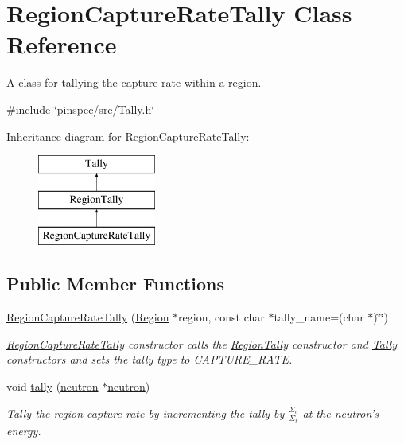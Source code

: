 \hypertarget{classRegionCaptureRateTally}{\section{Region\-Capture\-Rate\-Tally Class Reference}
\label{classRegionCaptureRateTally}
}


A class for tallying the capture rate within a region.  




{\ttfamily \#include \char`\"{}pinspec/src/\-Tally.\-h\char`\"{}}

Inheritance diagram for Region\-Capture\-Rate\-Tally\-:\begin{figure}[H]
\begin{center}
\leavevmode
\includegraphics[height=3.000000cm]{classRegionCaptureRateTally}
\end{center}
\end{figure}
\subsection*{Public Member Functions}
\begin{DoxyCompactItemize}
\item 
\hyperlink{classRegionCaptureRateTally_a7d0e48235eb320f44fa11b4395e3b7ae}{Region\-Capture\-Rate\-Tally} (\hyperlink{classRegion}{Region} $\ast$region, const char $\ast$tally\-\_\-name=(char $\ast$)\char`\"{}\char`\"{})
\begin{DoxyCompactList}\small\item\em \hyperlink{classRegionCaptureRateTally}{Region\-Capture\-Rate\-Tally} constructor calls the \hyperlink{classRegionTally}{Region\-Tally} constructor and \hyperlink{classTally}{Tally} constructors and sets the tally type to C\-A\-P\-T\-U\-R\-E\-\_\-\-R\-A\-T\-E. \end{DoxyCompactList}\item 
void \hyperlink{classRegionCaptureRateTally_a200bb4afe0bdf5520cc9756f644ebcd3}{tally} (\hyperlink{structneutron}{neutron} $\ast$\hyperlink{structneutron}{neutron})
\begin{DoxyCompactList}\small\item\em \hyperlink{classTally}{Tally} the region capture rate by incrementing the tally by $ \frac{\Sigma_c}{\Sigma_t} $ at the neutron's energy. \end{DoxyCompactList}\end{DoxyCompactItemize}
